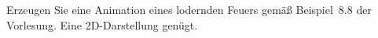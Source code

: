 %
Erzeugen Sie eine Animation eines lodernden Feuers gemäß Beispiel~8.8 der
Vorlesung. Eine 2D-Darstellung genügt. 
